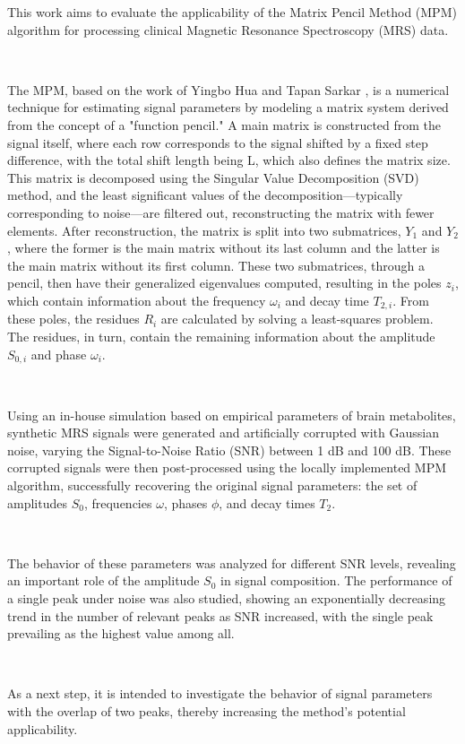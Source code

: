 \documentclass[10pt]{article}
\begin{document}
\vspace{12pt}
\begin{justify}
\quad This work aims to evaluate the applicability of the Matrix Pencil Method (MPM) algorithm for processing clinical Magnetic Resonance Spectroscopy (MRS) data.

\

The MPM, based on the work of Yingbo Hua and Tapan Sarkar \cite{370583}, is a numerical technique for estimating signal parameters by modeling a matrix system derived from 
the concept of a "function pencil." A main matrix is constructed from the signal itself, where each row corresponds to the signal shifted by a fixed step difference, 
with the total shift length being L, which also defines the matrix size. This matrix is decomposed using the Singular Value Decomposition (SVD) method, and the least 
significant values of the decomposition—typically corresponding to noise—are filtered out, reconstructing the matrix with fewer elements. After reconstruction, the 
matrix is split into two submatrices, $Y_1$ and $Y_2$, where the former is the main matrix without its last column and the latter is the main matrix without its first column. 
These two submatrices, through a pencil, then have their generalized eigenvalues computed, resulting in the poles $z_i$, which contain information about the frequency $\omega_i$ 
and decay time $T_{2,i}$. From these poles, the residues $R_i$ are calculated by solving a least-squares problem. The residues, in turn, contain the remaining information about 
the amplitude $S_{0,i}$ and phase $\omega_i$.

\

Using an in-house simulation based on empirical parameters of brain metabolites, synthetic MRS signals were generated and artificially corrupted with Gaussian noise, 
varying the Signal-to-Noise Ratio (SNR) between 1 dB and 100 dB. These corrupted signals were then post-processed using the locally implemented MPM algorithm, 
successfully recovering the original signal parameters: the set of amplitudes $S_0$, frequencies $\omega$, phases $\phi$, and decay times $T_2$.

\

The behavior of these parameters was analyzed for different SNR levels, revealing an important role of the amplitude $S_0$ in signal composition. The performance of a 
single peak under noise was also studied, showing an exponentially decreasing trend in the number of relevant peaks as SNR increased, with the single peak prevailing 
as the highest value among all.

\

As a next step, it is intended to investigate the behavior of signal parameters with the overlap of two peaks, thereby increasing the method's potential applicability.
\end{justify}
\end{document}
